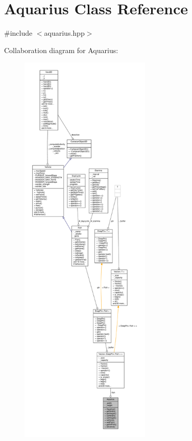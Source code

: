 \hypertarget{classAquarius}{}\section{Aquarius Class Reference}
\label{classAquarius}


{\ttfamily \#include $<$aquarius.\+hpp$>$}



Collaboration diagram for Aquarius\+:\nopagebreak
\begin{figure}[H]
\begin{center}
\leavevmode
\includegraphics[height=550pt]{classAquarius__coll__graph}
\end{center}
\end{figure}
